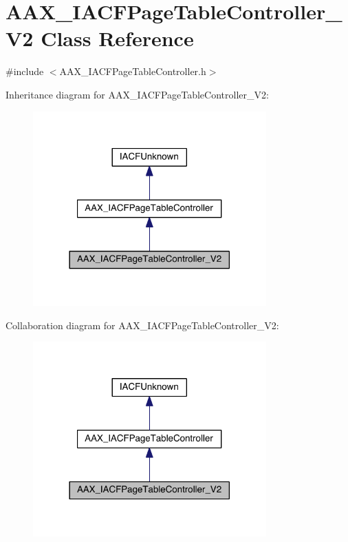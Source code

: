 \hypertarget{a00077}{}\section{A\+A\+X\+\_\+\+I\+A\+C\+F\+Page\+Table\+Controller\+\_\+\+V2 Class Reference}
\label{a00077}


{\ttfamily \#include $<$A\+A\+X\+\_\+\+I\+A\+C\+F\+Page\+Table\+Controller.\+h$>$}



Inheritance diagram for A\+A\+X\+\_\+\+I\+A\+C\+F\+Page\+Table\+Controller\+\_\+\+V2\+:
\nopagebreak
\begin{figure}[H]
\begin{center}
\leavevmode
\includegraphics[width=254pt]{a00574}
\end{center}
\end{figure}


Collaboration diagram for A\+A\+X\+\_\+\+I\+A\+C\+F\+Page\+Table\+Controller\+\_\+\+V2\+:
\nopagebreak
\begin{figure}[H]
\begin{center}
\leavevmode
\includegraphics[width=254pt]{a00575}
\end{center}
\end{figure}


